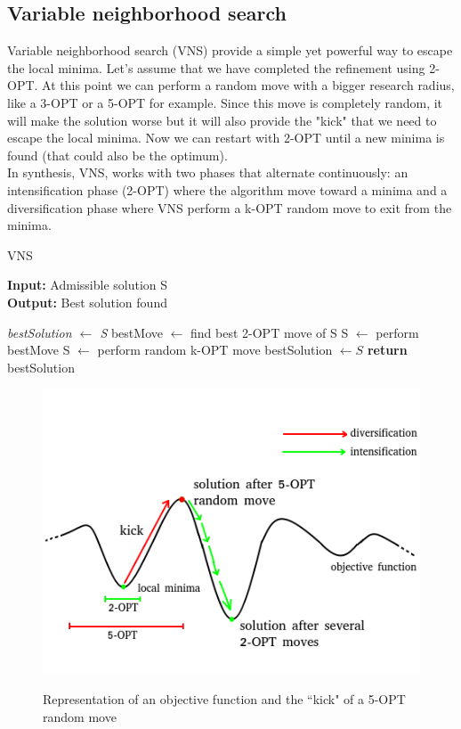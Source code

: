 \subsection{Variable neighborhood search}
Variable neighborhood search (VNS) provide a simple yet powerful way to escape the local minima. Let's assume that we have completed the refinement using 2-OPT. At this point we can perform a random move with a bigger research radius, like a 3-OPT or a 5-OPT for example. Since this move is completely random, it will make the solution worse but it will also provide the "kick" that we need to escape the local minima. Now we can restart with 2-OPT until a new minima is found (that could also be the optimum).\\
In synthesis, VNS, works with two phases that alternate continuously: an intensification  phase (2-OPT) where the algorithm move toward a minima and a diversification phase where VNS perform a k-OPT random move to exit from the minima.

\begin{algorithm}
	\caption{VNS}\label{VNS method}
	\hspace*{\algorithmicindent} \textbf{Input:} Admissible solution S \\
	\hspace*{\algorithmicindent} \textbf{Output:} Best solution found
    \begin{algorithmic}[1]
    		\State \textit{bestSolution $\leftarrow$ S}
			\State bestMove $\leftarrow$ find best 2-OPT move of S
				\State S $\leftarrow$ perform bestMove
			\Else
				\State S $\leftarrow$ perform random k-OPT move
			\EndIf
				\State bestSolution $\leftarrow S$
			\EndIf
		\EndWhile
		\State \textbf{return} bestSolution
    \end{algorithmic}
\end{algorithm}

\begin{figure}[h!]
\centering
	\includegraphics[scale=0.8]{media/VNS.png} \\
	\caption{Representation of an objective function and the ``kick" of a 5-OPT random move}
\end{figure}

